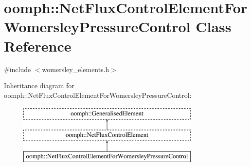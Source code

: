 \hypertarget{classoomph_1_1NetFluxControlElementForWomersleyPressureControl}{}\section{oomph\+:\+:Net\+Flux\+Control\+Element\+For\+Womersley\+Pressure\+Control Class Reference}
\label{classoomph_1_1NetFluxControlElementForWomersleyPressureControl}


{\ttfamily \#include $<$womersley\+\_\+elements.\+h$>$}

Inheritance diagram for oomph\+:\+:Net\+Flux\+Control\+Element\+For\+Womersley\+Pressure\+Control\+:\begin{figure}[H]
\begin{center}
\leavevmode
\includegraphics[height=3.000000cm]{classoomph_1_1NetFluxControlElementForWomersleyPressureControl}
\end{center}
\end{figure}
